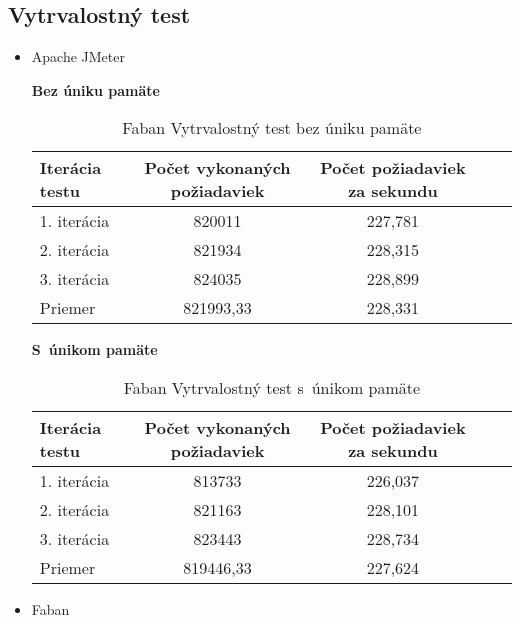 \documentclass[12pt,oneside,final]{fithesis-utf8}
\begin{document}
\subsection{Vytrvalostný test}

\begin{itemize}

\item Apache JMeter

\textbf{Bez úniku pamäte}

\begin{table}[H]
\begin{center}
\begin{tabular}{ | l | c | c | c | c |}
		\hline
		 \textbf{Iterácia testu} & \textbf{Počet vykonaných požiadaviek} & \textbf{Počet požiadaviek za sekundu} \\ \hline
		 1. iterácia & 820011 & 227,781 \\ \hline
		 2. iterácia & 821934 & 228,315 \\ \hline
		 3. iterácia & 824035 & 228,899 \\ \hline
		 Priemer & 821993,33 & 228,331 \\ \hline
		 
\end{tabular}
\end{center}
\caption{Faban Vytrvalostný test bez úniku pamäte}
\end{table}



\textbf{S~únikom pamäte}

\begin{table}[H]
\begin{center}
\begin{tabular}{ | l | c | c | c | c |}
		\hline
		 \textbf{Iterácia testu} & \textbf{Počet vykonaných požiadaviek} & \textbf{Počet požiadaviek za sekundu} \\ \hline
		 1. iterácia & 813733 & 226,037 \\ \hline
		 2. iterácia & 821163 & 228,101 \\ \hline
		 3. iterácia & 823443 & 228,734 \\ \hline
		 Priemer & 819446,33 & 227,624 \\ \hline
		 
\end{tabular}
\end{center}
\caption{Faban Vytrvalostný test s~únikom pamäte}
\end{table}

\item Faban


\end{itemize}
\end{document}
